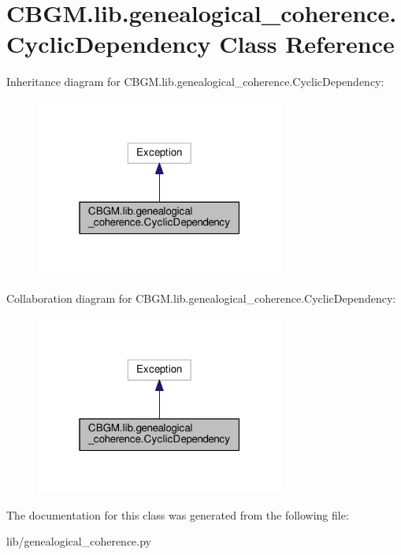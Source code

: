 \hypertarget{classCBGM_1_1lib_1_1genealogical__coherence_1_1CyclicDependency}{}\section{C\+B\+G\+M.\+lib.\+genealogical\+\_\+coherence.\+Cyclic\+Dependency Class Reference}
\label{classCBGM_1_1lib_1_1genealogical__coherence_1_1CyclicDependency}


Inheritance diagram for C\+B\+G\+M.\+lib.\+genealogical\+\_\+coherence.\+Cyclic\+Dependency\+:\nopagebreak
\begin{figure}[H]
\begin{center}
\leavevmode
\includegraphics[width=232pt]{classCBGM_1_1lib_1_1genealogical__coherence_1_1CyclicDependency__inherit__graph}
\end{center}
\end{figure}


Collaboration diagram for C\+B\+G\+M.\+lib.\+genealogical\+\_\+coherence.\+Cyclic\+Dependency\+:\nopagebreak
\begin{figure}[H]
\begin{center}
\leavevmode
\includegraphics[width=232pt]{classCBGM_1_1lib_1_1genealogical__coherence_1_1CyclicDependency__coll__graph}
\end{center}
\end{figure}


The documentation for this class was generated from the following file\+:\begin{DoxyCompactItemize}
\item 
lib/genealogical\+\_\+coherence.\+py\end{DoxyCompactItemize}
